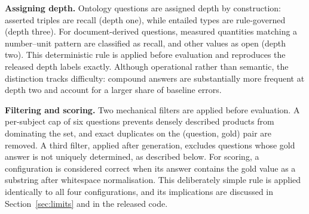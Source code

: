 \documentclass[conference]{IEEEtran}
\begin{document}
\textbf{Assigning depth.} Ontology questions are assigned depth by construction: asserted triples are recall (depth one), while entailed types are rule-governed (depth three). For document-derived questions, measured quantities matching a number--unit pattern are classified as recall, and other values as open (depth two). This deterministic rule is applied before evaluation and reproduces the released depth labels exactly. Although operational rather than semantic, the distinction tracks difficulty: compound answers are substantially more frequent at depth two and account for a larger share of baseline errors.


\textbf{Filtering and scoring.} Two mechanical filters are applied before evaluation. A per-subject cap of six questions prevents densely described products from dominating the set, and exact duplicates on the (question, gold) pair are removed. A third filter, applied after generation, excludes questions whose gold answer is not uniquely determined, as described below. For scoring, a configuration is considered correct when its answer contains the gold value as a substring after whitespace normalisation. This deliberately simple rule is applied identically to all four configurations, and its implications are discussed in Section~\ref{sec:limits} and in the released code.
\end{document}
